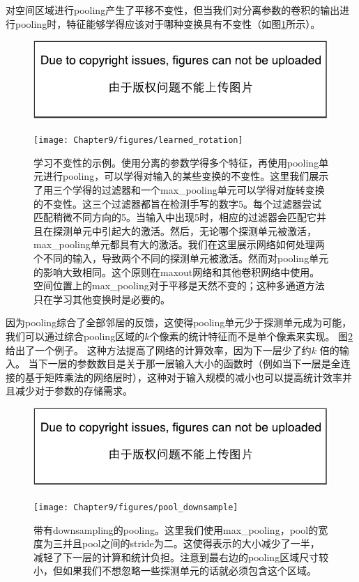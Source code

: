 对空间区域进行\gls{pooling}产生了平移不变性，但当我们对分离参数的卷积的输出进行\gls{pooling}时，特征能够学得应该对于哪种变换具有不变性（如图\ref{fig:chap9_learned_rotation}所示）。
\begin{figure}[!htb]
\ifOpenSource
\centerline{\includegraphics{figure.pdf}}
\else
\centerline{\texttt{[image: Chapter9/figures/learned\_rotation]}}
\fi
\caption{学习不变性的示例。使用分离的参数学得多个特征，再使用\gls{pooling}单元进行\gls{pooling}，可以学得对输入的某些变换的不变性。这里我们展示了用三个学得的过滤器和一个\gls{max_pooling}单元可以学得对旋转变换的不变性。这三个过滤器都旨在检测手写的数字5。每个过滤器尝试匹配稍微不同方向的5。当输入中出现5时，相应的过滤器会匹配它并且在探测单元中引起大的激活。然后，无论哪个探测单元被激活，\gls{max_pooling}单元都具有大的激活。我们在这里展示网络如何处理两个不同的输入，导致两个不同的探测单元被激活。然而对\gls{pooling}单元的影响大致相同。这个原则在\gls{maxout}网络\citep{Goodfellow-et-al-ICML2013}和其他卷积网络中使用。空间位置上的\gls{max_pooling}对于平移是天然不变的；这种多通道方法只在学习其他变换时是必要的。}
\label{fig:chap9_learned_rotation}
\end{figure}

 
因为\gls{pooling}综合了全部邻居的反馈，这使得\gls{pooling}单元少于探测单元成为可能，我们可以通过综合\gls{pooling}区域的$k$个像素的统计特征而不是单个像素来实现。
图\ref{fig:chap9_pool_downsample}给出了一个例子。
这种方法提高了网络的计算效率，因为下一层少了约$k$ 倍的输入。
当下一层的参数数目是关于那一层输入大小的函数时（例如当下一层是全连接的基于矩阵乘法的网络层时），这种对于输入规模的减小也可以提高统计效率并且减少对于参数的存储需求。
\begin{figure}[!htb]
\ifOpenSource
\centerline{\includegraphics{figure.pdf}}
\else
\centerline{\texttt{[image: Chapter9/figures/pool\_downsample]}}
\fi
\caption{带有\gls{downsampling}的\gls{pooling}。这里我们使用\gls{max_pooling}，\gls{pool}的宽度为三并且\gls{pool}之间的\gls{stride}为二。这使得表示的大小减少了一半，减轻了下一层的计算和统计负担。注意到最右边的\gls{pooling}区域尺寸较小，但如果我们不想忽略一些探测单元的话就必须包含这个区域。}
\label{fig:chap9_pool_downsample}
\end{figure}

